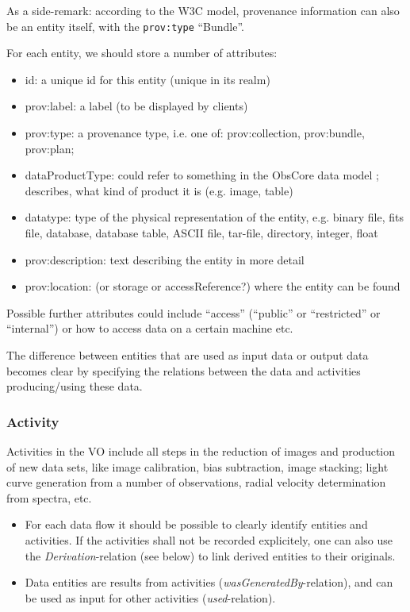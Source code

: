\documentclass[11pt,a4paper]{ivoa}
\begin{document}
As a side-remark: according to the W3C model,  provenance information can also be an entity itself, with the \texttt{prov:type} ``Bundle''.

For each entity, we should store a number of attributes:
\begin{itemize}
\item id: a unique id for this entity (unique in its realm)
\item prov:label: a label (to be displayed by clients)
\item prov:type: a provenance type, i.e. one of: prov:collection, prov:bundle, prov:plan; 
\item dataProductType: could refer to something in the ObsCore data model \citep{std:ObsCore}; describes, what kind of product it is (e.g. image, table)
\item datatype: type of the physical representation of the entity, e.g. binary file, fits file, database, database table, ASCII file, tar-file, directory, integer, float
\item prov:description: text describing the entity in more detail
\item prov:location: (or storage or accessReference?) where the entity can be found
\end{itemize}

Possible further attributes could include  ``access'' (``public'' or ``restricted'' or 
``internal'') or how to access data on a certain machine etc.

The difference between entities that are used as input data or output data 
becomes clear by specifying the relations between the data and activities producing/using these data.

\subsubsection{Activity}
Activities in the VO include all steps in the reduction of images and production of new data sets, like image calibration, bias subtraction, image stacking; light curve generation from a number of observations, radial velocity determination from spectra, etc.

\begin{itemize}
\item For each data flow it should be possible to clearly identify entities and activities. If the activities shall not be recorded explicitely, one can also use the \emph{Derivation}-relation (see below) to link derived entities to their originals.

\item Data entities are results from activities (\emph{wasGeneratedBy}-relation), and can be used as input for other activities (\emph{used}-relation). 

\end{itemize}
\end{document}
